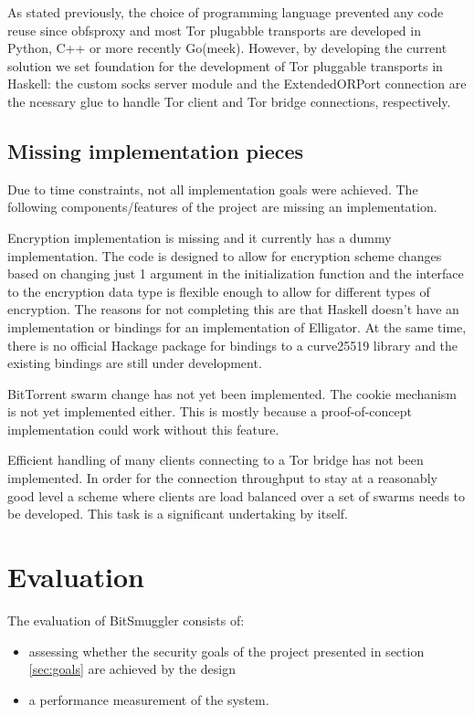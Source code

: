 \documentclass[11pt]{book} %
\newcommand{\projectName}{BitSmuggler }
\begin{document}
As stated previously, the choice of programming language prevented any code reuse since obfsproxy and most Tor plugabble transports are developed in Python, C++ or more recently Go(meek). However, by developing the current solution we set foundation for the development of Tor pluggable transports in Haskell: the custom socks server module and the ExtendedORPort connection are the ncessary glue to handle Tor client and Tor bridge connections, respectively.

\section{Missing implementation pieces}

Due to time constraints, not all implementation goals were achieved. The following components/features of the project are missing an implementation.

Encryption implementation is missing and it currently has a dummy implementation. The code is designed to allow for encryption scheme changes based on changing just 1 argument in the initialization function and the interface to the encryption data type is flexible enough to allow for different types of encryption. The reasons for not completing this are that Haskell doesn't have an implementation or bindings for an implementation of Elligator. At the same time,  there is no official Hackage package for bindings to a curve25519 library and the existing bindings are still under development.

BitTorrent swarm change has not yet been implemented. The cookie mechanism is not yet implemented either. This is mostly because a proof-of-concept implementation could work without this feature.

Efficient handling of many clients connecting to a Tor bridge has not been implemented. In order for the connection throughput to stay at a reasonably good level a scheme where clients are load balanced over a set of swarms needs to be developed. This task is a significant undertaking by itself.

\chapter{Evaluation}

The evaluation of \projectName consists of:
\begin{itemize}
\item assessing whether the security goals of the project presented in section \ref{sec:goals} are achieved by the design 
\item a performance measurement of the system.
\end{itemize}
\end{document}
